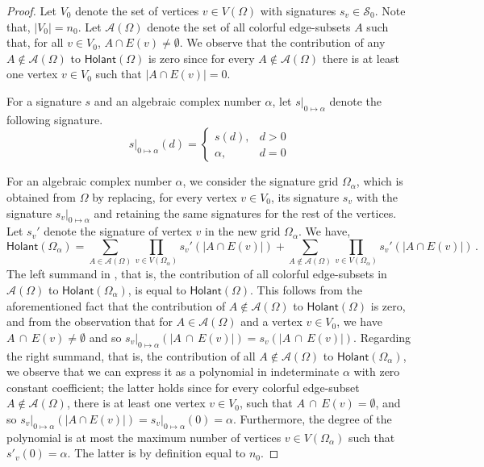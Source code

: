 \documentclass[authorcolumns,numberwithinsect]{no-lipics-v2022}
\newcommand{\zsig}[2]{\ensuremath{#1\lvert_{0\mapsto#2}}}
\newcommand{\holant}{\mathsf{Holant}}
\begin{document}
\begin{proof}
Let $V_0$ denote the set of vertices $v \in V(\Omega)$ with signatures $s_v \in \mathcal{S}_0$. Note that, $|V_0| = n_0$. Let $\mathcal{A}(\Omega)$ denote the set of all colorful edge-subsets $A$ such that, for all $v \in V_0$, $A \cap E(v) \neq \emptyset$. We observe that the contribution of any $A \notin \mathcal{A}(\Omega)$ to $\holant(\Omega)$ is zero since for every $A \notin \mathcal{A}(\Omega)$ there is at least one vertex $v \in V_0$ such that $|A\cap E(v)| = 0$. 

For a signature $s$ and an algebraic complex number $\alpha$, let $\zsig{s}{\alpha}$ denote the following signature.
\[
\zsig{s}{\alpha}(d) = 
\begin{cases}
s(d), & d > 0  \\
\alpha, & d = 0 
\end{cases}
\]

For an algebraic complex number $\alpha$, we consider the signature grid $\Omega_{\alpha}$, which is obtained from $\Omega$ by replacing, for every vertex $v \in V_0$, its signature $s_v$ with the signature $\zsig{s_v}{\alpha}$ and retaining the same signatures for the rest of the vertices. Let $s_v'$ denote the signature of vertex $v$ in the new grid $\Omega_{\alpha}$. We have,
\begin{equation}\label{eq:holant-alpha}
\holant(\Omega_{\alpha}) = \sum_{A \in \mathcal{A}(\Omega)}\prod_{v \in V(\Omega_{\alpha})}s_v'(|A\cap E(v)|) + \sum_{A \notin \mathcal{A}(\Omega)}\prod_{v \in V(\Omega_{\alpha})}s_v'(|A\cap E(v)|)\,.
\end{equation} 
The left summand in , that is,
the contribution of all colorful edge-subsets in $\mathcal{A}(\Omega)$ to $\holant(\Omega_{\alpha})$, is equal to $\holant(\Omega)$. This follows from the aforementioned fact that the contribution of $A\notin \mathcal{A}(\Omega)$ to $\holant(\Omega)$ is zero, and from the observation that for $A \in \mathcal{A}(\Omega)$ and a vertex $v \in V_0$, we have $A\,\cap\,E(v) \neq \emptyset$ and so $\zsig{s_v}{\alpha}(|A\,\cap\,E(v)|) = s_v(|A\,\cap\,E(v)|)$. Regarding the right summand, that is, the contribution of all $A \notin \mathcal{A}(\Omega)$ to $\holant(\Omega_{\alpha})$, we observe that we can express it as a polynomial in indeterminate $\alpha$ with zero constant coefficient; the latter holds since for every colorful edge-subset $A \notin \mathcal{A}(\Omega)$, there is at least one vertex $v \in V_0$, such that $A\,\cap\,E(v) = \emptyset$, and so $\zsig{s_v}{\alpha}(|A\cap E(v)|) = \zsig{s_v}{\alpha}(0) = \alpha$. Furthermore, the degree of the polynomial is at most the maximum number of vertices $v \in V(\Omega_{\alpha})$ such that $s'_v(0) = \alpha$. The latter is by definition equal to $n_0$. 


\end{proof}
\end{document}
